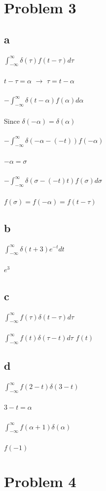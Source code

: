\documentclass{article}
\begin{document}
\section{Problem 3}
\subsection{a}
$\int_{-\infty}^{\infty}\delta (\tau)f(t-\tau)d\tau$\\ \\
$t-\tau=\alpha$ $\rightarrow$ $\tau=t-\alpha$\\ \\
$-\int_{-\infty}^{\infty}\delta (t- \alpha)f(\alpha)d\alpha$\\ \\
Since $\delta (-\alpha)=\delta (\alpha)$\\ \\
$-\int_{-\infty}^{\infty}\delta(-\alpha-(-t))f(-\alpha)$ \\ \\
$-\alpha=\sigma$ \\ \\
$-\int_{-\infty}^{\infty}\delta(\sigma-(-t)t)f(\sigma)d\sigma$ \\ \\
$f(\sigma)=f(-\alpha)=f(t-\tau)$
\subsection{b}
$\int_{-\infty}^{\infty}\delta(t+3)e^{-t}dt$\\ \\
$e^{3}$
\subsection{c}
$\int_{-\infty}^{\infty}f(\tau)\delta(t-\tau)d\tau$ \\ \\
$\int_{-\infty}^{\infty}f(t)\delta(\tau-t)d\tau$
$f(t)$
\subsection{d}
$\int_{-\infty}^{\infty}f(2-t)\delta(3-t)$ \\ \\
$3-t=\alpha$ \\ \\
$\int_{-\infty}^{\infty}f(\alpha+1)\delta(\alpha)$ \\ \\
$f(-1)$
\section{Problem 4}
\end{document}
